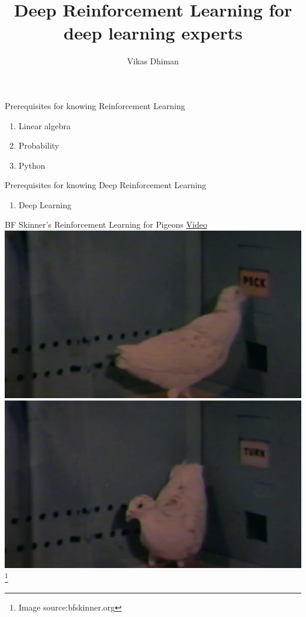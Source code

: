 \documentclass[notes]{beamer} %
\title[DRL for DL experts]{Deep Reinforcement Learning for deep learning experts}
\author{Vikas Dhiman}
\begin{document}
\maketitle

\begin{frame}
  Prerequisites for knowing Reinforcement Learning
  \begin{enumerate}
    \item Linear algebra 
    \item Probability
    \item Python
  \end{enumerate}

  Prerequisites for knowing Deep Reinforcement Learning
  \begin{enumerate}
  \item Deep Learning
  \end{enumerate}
\end{frame}

\begin{frame}{BF Skinner's Reinforcement Learning for Pigeons}
  \centering
  \href{http://bfskinner.org/wp-content/uploads/2015/02/Operant_Conditioning.mp4}{Video}\\
  \includegraphics[width=0.45\linewidth]{media/pigeon-peck.png}%
  \includegraphics[width=0.45\linewidth]{media/pigeon-turn.png}
  \footnote{Image source:bfskinner.org}

\end{frame}

\end{document}
